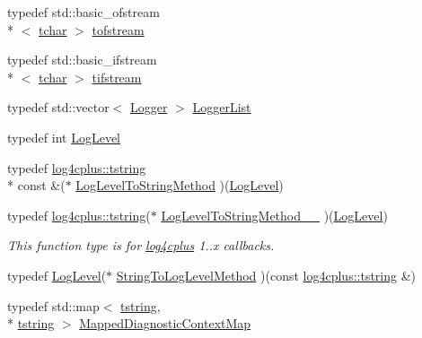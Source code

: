 \begin{DoxyCompactItemize}
\item 
typedef std\-::basic\-\_\-ofstream\\*
$<$ \hyperlink{namespacelog4cplus_a7b80b5711ae9e7a1ddd97dbaefbe3583}{tchar} $>$ \hyperlink{namespacelog4cplus_a2f9380184debead93aa014e022fca22e}{tofstream}
\item 
typedef std\-::basic\-\_\-ifstream\\*
$<$ \hyperlink{namespacelog4cplus_a7b80b5711ae9e7a1ddd97dbaefbe3583}{tchar} $>$ \hyperlink{namespacelog4cplus_a023f485e6c5f8b014d1283192aaee983}{tifstream}
\item 
typedef std\-::vector$<$ \hyperlink{classlog4cplus_1_1Logger}{Logger} $>$ \hyperlink{namespacelog4cplus_a9bad705b454c9c31bd84d97837fec22f}{Logger\-List}
\item 
typedef int \hyperlink{namespacelog4cplus_abd332cc8c98fefcbbdcf57b6b3867de9}{Log\-Level}
\item 
typedef \hyperlink{namespacelog4cplus_a3c9287f6ebcddc50355e29d71152117b}{log4cplus\-::tstring} \\*
const \&($\ast$ \hyperlink{namespacelog4cplus_affe4873120aa349e25a21f2e0925f3d4}{Log\-Level\-To\-String\-Method} )(\hyperlink{namespacelog4cplus_abd332cc8c98fefcbbdcf57b6b3867de9}{Log\-Level})
\item 
typedef \hyperlink{namespacelog4cplus_a3c9287f6ebcddc50355e29d71152117b}{log4cplus\-::tstring}($\ast$ \hyperlink{namespacelog4cplus_adaf78472c00019b22f0da0d2ccecc3ca}{Log\-Level\-To\-String\-Method\-\_\-\_} )(\hyperlink{namespacelog4cplus_abd332cc8c98fefcbbdcf57b6b3867de9}{Log\-Level})
\begin{DoxyCompactList}\small\item\em This function type is for \hyperlink{namespacelog4cplus}{log4cplus} 1..\-x callbacks. \end{DoxyCompactList}\item 
typedef \hyperlink{namespacelog4cplus_abd332cc8c98fefcbbdcf57b6b3867de9}{Log\-Level}($\ast$ \hyperlink{namespacelog4cplus_a8c44b16c1c39b70a117adea176b77275}{String\-To\-Log\-Level\-Method} )(const \hyperlink{namespacelog4cplus_a3c9287f6ebcddc50355e29d71152117b}{log4cplus\-::tstring} \&)
\item 
typedef std\-::map$<$ \hyperlink{namespacelog4cplus_a3c9287f6ebcddc50355e29d71152117b}{tstring}, \\*
\hyperlink{namespacelog4cplus_a3c9287f6ebcddc50355e29d71152117b}{tstring} $>$ \hyperlink{namespacelog4cplus_a8b5b860e781a3d8d5c3d7d743a630b8a}{Mapped\-Diagnostic\-Context\-Map}
\item 

\end{DoxyCompactItemize}
